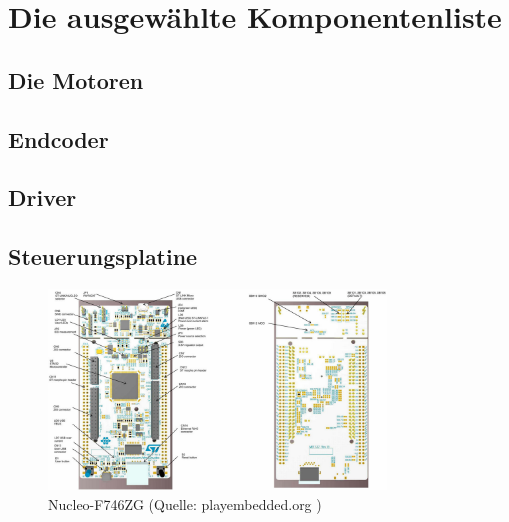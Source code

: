 \renewcommand{\autoren}{Valentyn Chepil}
\newpage
\section{Die ausgewählte Komponentenliste}
\subsection{Die Motoren}


\subsection{Endcoder}


\subsection{Driver}


\subsection{Steuerungsplatine}
\begin{figure}[!h]  %
	\centering\includegraphics[width=0.8\textwidth]{images/Nucleo.jpg}
	\caption{Nucleo-F746ZG  \newline (Quelle: playembedded.org )}
	\label{Nucleo} %
\end{figure}



